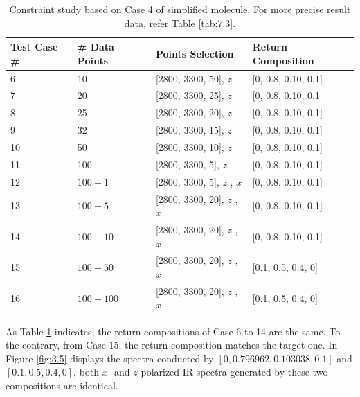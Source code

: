 \begin{table} \small
\begin{center}
{\def\arraystretch{1.5}
\begin{tabular}{| p{3cm} | p{3cm} | p{4cm} | l |} \hline
	Test Case \# & \# Data Points & Points Selection & Return Composition \\ \hline
	6 & 10 & [2800, 3300, 50], $z$ & [0, 0.8, 0.10, 0.1] \\ \hline
	7 & 20 & [2800, 3300, 25], $z$ & [0, 0.8, 0.10, 0.1 \\ \hline
	8 & 25 & [2800, 3300, 20], $z$ & [0, 0.8, 0.10, 0.1] \\ \hline
	9 & 32 & [2800, 3300, 15], $z$ & [0, 0.8, 0.10, 0.1] \\ \hline
	10 & 50 & [2800, 3300, 10], $z$ & [0, 0.8, 0.10, 0.1] \\ \hline
	11 & 100 & [2800, 3300, 5], $z$ & [0, 0.8, 0.10, 0.1] \\ \hline
	12 & $100 + 1$ & [2800, 3300, 5], $z$ \newline [2800, 3300, 500], $x$ & [0, 0.8, 0.10, 0.1] \\ \hline
	13 & $100 + 5$ & [2800, 3300, 20], $z$ \newline [2800, 3300, 100], $x$ & [0, 0.8, 0.10, 0.1] \\ \hline
	14 & $100 + 10$ & [2800, 3300, 20], $z$ \newline  [2800, 3300, 50], $x$ & [0, 0.8, 0.10, 0.1] \\ \hline
	15 & $100 + 50$ & [2800, 3300, 20], $z$ \newline  [2800, 3300, 10], $x$ & [0.1, 0.5, 0.4, 0] \\ \hline
	16 & $100 + 100$ & [2800, 3300, 20], $z$ \newline  [2800, 3300, 5], $x$ & [0.1, 0.5, 0.4, 0] \\ 
	\hline
\end{tabular} 
}
\end{center}
\caption{Constraint study based on Case 4 of simplified molecule. For more precise result data, refer Table \ref{tab:7.3}.} \label{tab:3.4}
\end{table}

As Table \ref{tab:3.4} indicates, the return compositions of Case 6 to 14 are the same. To the contrary, from Case 15, the return composition matches the target one. In Figure \ref{fig:3.5} displays the spectra conducted by $[0, 0.796962, 0.103038, 0.1]$ and $[0.1, 0.5, 0.4, 0]$, both $x$- and $z$-polarized IR spectra generated by these two compositions are identical.

